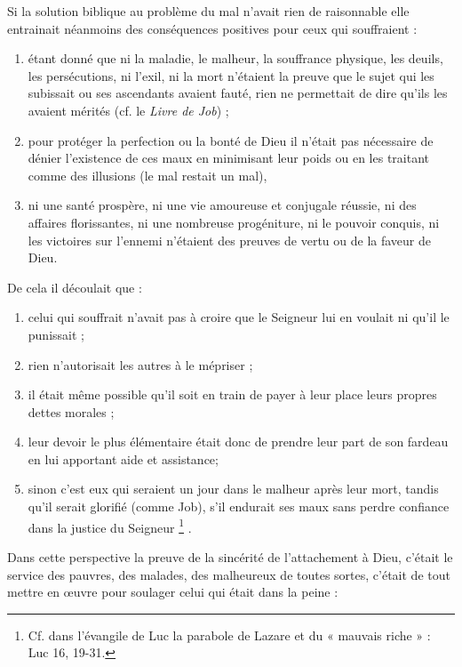  Si la solution biblique au problème du mal n'avait rien de raisonnable elle entrainait néanmoins des conséquences positives pour ceux qui souffraient :
\begin{enumerate}

\item étant donné que ni la maladie, le malheur, la souffrance physique, les deuils, les persécutions, ni l'exil, ni la mort n'étaient la preuve que le sujet qui les subissait ou ses ascendants avaient fauté, rien ne permettait de dire qu'ils les avaient mérités (cf. le \emph{Livre de Job}) ;
\item pour protéger la perfection ou la bonté de Dieu il n'était pas nécessaire de dénier l'existence de ces maux en minimisant leur poids ou en les traitant comme des illusions  (le mal restait un mal),
\item ni une santé prospère, ni une vie amoureuse et conjugale réussie, ni des affaires florissantes, ni une nombreuse progéniture, ni le pouvoir conquis, ni les victoires sur l'ennemi n'étaient des preuves de vertu ou de la faveur de Dieu.
\end{enumerate}

 De cela il découlait que :
\begin{enumerate}
\item celui qui souffrait n'avait pas à croire que le Seigneur lui en voulait ni qu'il le punissait ;
\item rien n'autorisait les autres à le mépriser ;
\item il était même possible qu'il soit en train de payer à leur place leurs propres dettes morales ;
\item leur devoir le plus élémentaire était donc de prendre leur part de son fardeau en lui apportant aide et assistance;
\item sinon c'est eux qui seraient un jour dans le malheur après leur mort, tandis qu'il serait glorifié (comme Job), s'il endurait ses maux sans perdre confiance dans la justice du Seigneur%
\footnote{Cf. dans l'évangile de Luc la parabole de Lazare et du « mauvais riche » : Luc 16, 19-31.}%
.
\end{enumerate}

 Dans cette perspective la preuve de la sincérité de l'attachement à Dieu, c'était le service des pauvres, des malades, des malheureux de toutes sortes, c'était de tout mettre en œuvre pour soulager celui qui était dans la peine :

